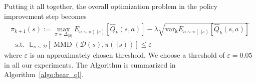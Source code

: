 Putting it all together, the overall optimization problem in the policy improvement step becomes
\begin{multline}
    \label{eqn:policy_update}
   \pi_{k+1}(s) := \max_{\pi \in \Delta_{|S|}} E_{a \sim \pi(\cdot|s)} [\hat{Q}_{k}(s, a)] - \lambda \sqrt{ \operatorname{var_k}E_{a \sim \pi(\cdot |s) }[\hat{Q}_k(s, a)]}\\
   \text{~~s.t.~~} \mathbb{E}_{s \sim \mathcal{D}} [\operatorname{MMD}(\mathcal{D}(s), \pi(\cdot|s))] \leq \varepsilon
\end{multline}
where $\varepsilon$ is an approximately chosen threshold. We choose a threshold of $\varepsilon=0.05$ in all our experiments. 
The Algorithm is summarized in Algorithm~\ref{algo:bear_ql}.


